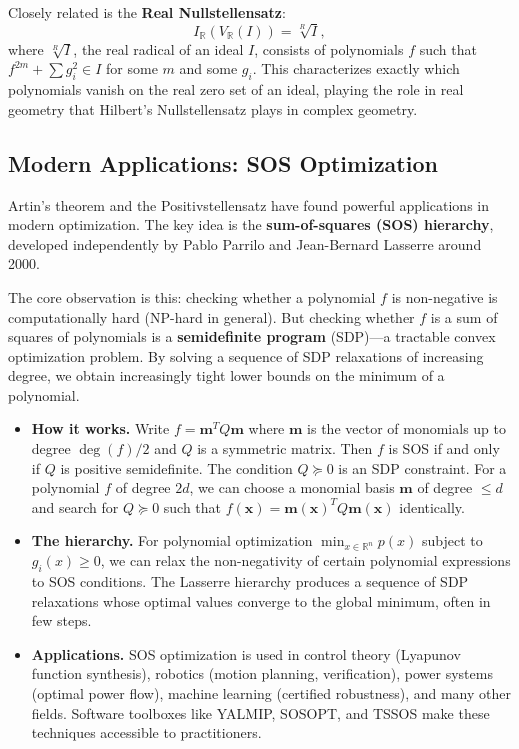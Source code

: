 Closely related is the \textbf{Real Nullstellensatz}:
\[
    I_{\mathbb{R}}(V_{\mathbb{R}}(I)) = \sqrt[R]{I},
\]
where $\sqrt[R]{I}$, the real radical of an ideal $I$, consists of polynomials $f$ such that $f^{2m} + \sum g_i^2 \in I$ for some $m$ and some $g_i$. This characterizes exactly which polynomials vanish on the real zero set of an ideal, playing the role in real geometry that Hilbert's Nullstellensatz plays in complex geometry.

\subsection{Modern Applications: SOS Optimization}

Artin's theorem and the Positivstellensatz have found powerful applications in modern optimization. The key idea is the \textbf{sum-of-squares (SOS) hierarchy}, developed independently by Pablo Parrilo and Jean-Bernard Lasserre around 2000.

The core observation is this: checking whether a polynomial $f$ is non-negative is computationally hard (NP-hard in general). But checking whether $f$ is a sum of squares of polynomials is a \textbf{semidefinite program} (SDP)---a tractable convex optimization problem. By solving a sequence of SDP relaxations of increasing degree, we obtain increasingly tight lower bounds on the minimum of a polynomial.

\begin{itemize}
    \item \textbf{How it works.} Write $f = \mathbf{m}^T Q \mathbf{m}$ where $\mathbf{m}$ is the vector of monomials up to degree $\deg(f)/2$ and $Q$ is a symmetric matrix. Then $f$ is SOS if and only if $Q$ is positive semidefinite. The condition $Q \succeq 0$ is an SDP constraint. For a polynomial $f$ of degree $2d$, we can choose a monomial basis $\mathbf{m}$ of degree $\leq d$ and search for $Q \succeq 0$ such that $f(\mathbf{x}) = \mathbf{m}(\mathbf{x})^T Q \mathbf{m}(\mathbf{x})$ identically.
    \item \textbf{The hierarchy.} For polynomial optimization $\min_{x \in \mathbb{R}^n} p(x)$ subject to $g_i(x) \geq 0$, we can relax the non-negativity of certain polynomial expressions to SOS conditions. The Lasserre hierarchy produces a sequence of SDP relaxations whose optimal values converge to the global minimum, often in few steps.
    \item \textbf{Applications.} SOS optimization is used in control theory (Lyapunov function synthesis), robotics (motion planning, verification), power systems (optimal power flow), machine learning (certified robustness), and many other fields. Software toolboxes like YALMIP, SOSOPT, and TSSOS make these techniques accessible to practitioners.
\end{itemize}


